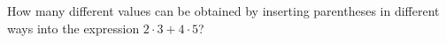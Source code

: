 How many different values can be obtained by inserting parentheses in different ways into the expression $2\cdot3+4\cdot5$?
